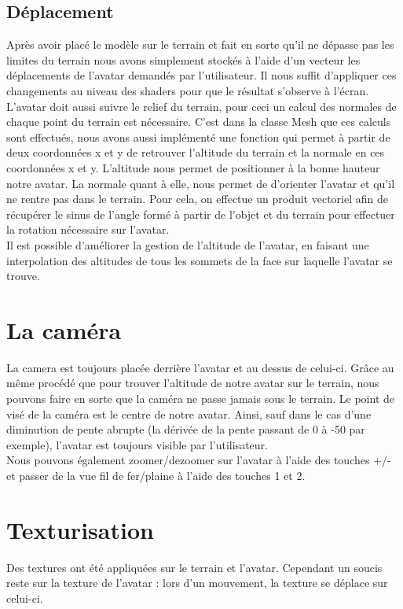 \documentclass{report}
\begin{document}
\subsection*{Déplacement}
Après avoir placé le modèle sur le terrain et fait en sorte qu'il ne dépasse pas les limites du terrain nous avons simplement stockés à l'aide d'un vecteur les déplacements de l'avatar demandés par l'utilisateur. Il nous suffit d'appliquer ces changements au niveau des shaders pour que le résultat s'observe à l'écran.\\


L'avatar doit aussi suivre le relief du terrain, pour ceci un calcul des normales de chaque point du terrain est nécessaire. C'est dans la classe Mesh que ces calculs sont effectués, nous avons aussi implémenté une fonction qui permet à partir de deux coordonnées x et y de retrouver l'altitude du terrain et la normale en ces coordonnées x et y. L'altitude nous permet de positionner à la bonne hauteur notre avatar. La normale quant à elle, nous permet de d'orienter l'avatar et qu'il ne rentre pas dans le terrain. Pour cela, on effectue un produit vectoriel afin de récupérer le sinus de l'angle formé à partir de l'objet et du terrain pour effectuer la rotation nécessaire sur l'avatar.\\


Il est possible d'améliorer la gestion de l'altitude de l'avatar, en faisant une interpolation des altitudes de tous les sommets de la face sur laquelle l'avatar se trouve.

\section{La caméra}
La camera est toujours placée derrière l'avatar et au dessus de celui-ci. Grâce au même procédé que pour trouver l'altitude de notre avatar sur le terrain, nous pouvons faire en sorte que la caméra ne passe jamais sous le terrain. Le point de visé de la caméra est le centre de notre avatar. Ainsi, sauf dans le cas d'une diminution de pente abrupte (la dérivée de la pente passant de 0 à -50 par exemple), l'avatar est toujours visible par l'utilisateur.\\

Nous pouvons également zoomer/dezoomer sur l'avatar à l'aide des touches +/- et passer de la vue fil de fer/plaine à l'aide des touches 1 et 2.
	
\section{Texturisation}
Des textures ont été appliquées sur le terrain et l'avatar. Cependant un soucis reste sur la texture de l'avatar : lors d'un mouvement, la texture se déplace sur celui-ci.
	 
\end{document}
